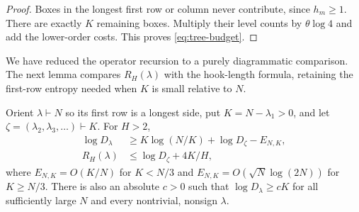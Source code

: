 \begin{proof}
Boxes in the longest first row or column never contribute, since $h_m\ge1$. There are exactly $K$ remaining boxes. Multiply their level counts by $\theta\log4$ and add the lower-order costs. This proves \eqref{eq:tree-budget}.
\end{proof}

We have reduced the operator recursion to a purely diagrammatic comparison. The next lemma compares $R_H(\lambda)$ with the hook-length formula, retaining the first-row entropy needed when $K$ is small relative to $N$.

\begin{lemma}\label{lem:hook-comparison}
Orient $\lambda\vdash N$ so its first row is a longest side, put $K=N-\lambda_1>0$, and let $\zeta=(\lambda_2,\lambda_3,\ldots)\vdash K$. For $H>2$,
\begin{align}
 \log D_\lambda
 &\ge K\log(N/K)+\log D_\zeta-E_{N,K},\label{eq:row-hook}\\
 R_H(\lambda)&\le\log D_\zeta+4K/H,\label{eq:rank-hook}
\end{align}
where $E_{N,K}=O(K/N)$ for $K<N/3$ and
$E_{N,K}=O(\sqrt N\log(2N))$ for $K\ge N/3$.
There is also an absolute $c>0$ such that
$\log D_\lambda\ge cK$ for all sufficiently large $N$ and every nontrivial, nonsign $\lambda$.
\end{lemma}
